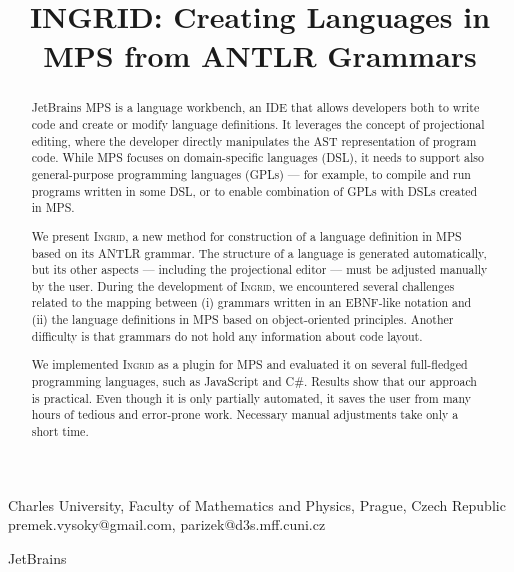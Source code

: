 \documentclass[preprint,10pt,numbers]{sigplanconf}
\begin{document}



\title{INGRID: Creating Languages in MPS from ANTLR Grammars}


	{Charles University, Faculty of Mathematics and Physics, Prague, Czech Republic}
	{premek.vysoky@gmail.com, parizek@d3s.mff.cuni.cz}

	{JetBrains}


\maketitle

\begin{abstract}
JetBrains MPS is a language workbench, an IDE that allows developers both to write code and create or modify language definitions.
It leverages the concept of projectional editing, where the developer directly manipulates the AST representation of program code.
While MPS focuses on domain-specific languages (DSL), it needs to support also general-purpose programming languages (GPLs) --- for example, to compile and run programs written in some DSL, or to enable combination of GPLs with DSLs created in MPS.

We present \textsc{Ingrid}, a new method for construction of a language definition in MPS based on its ANTLR grammar.
The structure of a language is generated automatically, but its other aspects --- including the projectional editor --- must be adjusted manually by the user.
During the development of \textsc{Ingrid}, we encountered several challenges related to the mapping between (i) grammars written in an EBNF-like notation and (ii) the language definitions in MPS based on object-oriented principles.
Another difficulty is that grammars do not hold any information about code layout.

We implemented \textsc{Ingrid} as a plugin for MPS and evaluated it on several full-fledged programming languages, such as JavaScript and C\#.
Results show that our approach is practical.
Even though it is only partially automated, it saves the user from many hours of tedious and error-prone work.
Necessary manual adjustments take only a short time.
\end{abstract}
\end{document}
